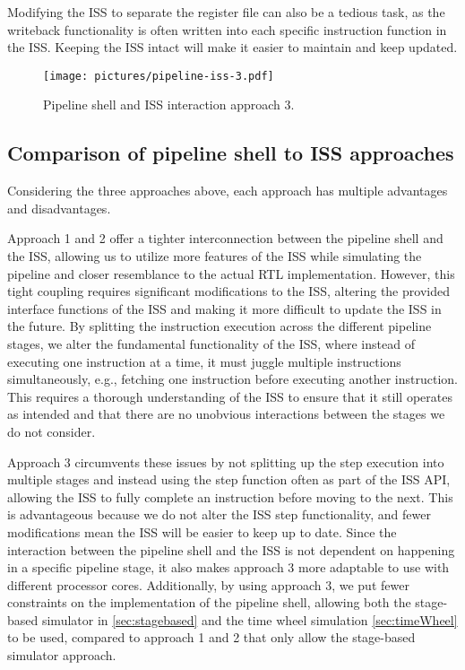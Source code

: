 Modifying the ISS to separate the register file can also be a tedious task, as the writeback functionality is often written into each specific instruction function in the ISS. Keeping the ISS intact will make it easier to maintain and keep updated.


\begin{figure}[ht]
    \centering
    \texttt{[image: pictures/pipeline-iss-3.pdf]}
    \caption{Pipeline shell and ISS interaction approach 3.}
    \label{fig:pipeline-iss-3}
\end{figure}

\subsection{Comparison of pipeline shell to ISS approaches}
\label{sec:pipeline-iss-comparison}

Considering the three approaches above, each approach has multiple advantages and disadvantages.

Approach 1 and 2 offer a tighter interconnection between the pipeline shell and the ISS, allowing us to utilize more features of the ISS while simulating the pipeline and closer resemblance to the actual RTL implementation. However, this tight coupling requires significant modifications to the ISS, altering the provided interface functions of the ISS and making it more difficult to update the ISS in the future.
By splitting the instruction execution across the different pipeline stages, we alter the fundamental functionality of the ISS, where instead of executing one instruction at a time, it must juggle multiple instructions simultaneously, e.g., fetching one instruction before executing another instruction. This requires a thorough understanding of the ISS to ensure that it still operates as intended and that there are no unobvious interactions between the stages we do not consider.  

Approach 3 circumvents these issues by not splitting up the step execution into multiple stages and instead using the step function often as part of the ISS API, allowing the ISS to fully complete an instruction before moving to the next. This is advantageous because we do not alter the ISS step functionality, and fewer modifications mean the ISS will be easier to keep up to date. Since the interaction between the pipeline shell and the ISS is not dependent on happening in a specific pipeline stage, it also makes approach 3 more adaptable to use with different processor cores. Additionally, by using approach 3, we put fewer constraints on the implementation of the pipeline shell, allowing both the stage-based simulator in \cref{sec:stagebased} and the time wheel simulation \cref{sec:timeWheel} to be used, compared to approach 1 and 2 that only allow the stage-based simulator approach. 

